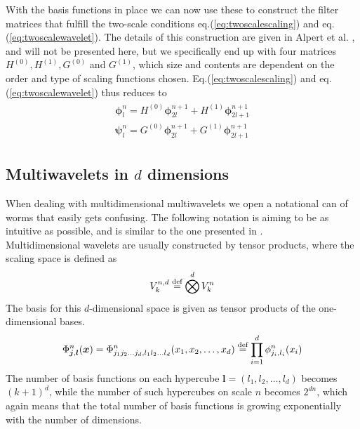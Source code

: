 \noindent
With the basis functions in place we can now use these to construct the filter
matrices that fulfill the two-scale conditions eq.(\ref{eq:twoscalescaling}) and
eq.(\ref{eq:twoscalewavelet}). The details of this construction are given in
Alpert et al. \cite{Alpert02}, and will not be presented here, but we
specifically end up with four matrices $H^{(0)}, H^{(1)}, G^{(0)}$ and
$G^{(1)}$, which size and contents are dependent on the order and type of
scaling functions chosen. Eq.(\ref{eq:twoscalescaling}) and 
eq.(\ref{eq:twoscalewavelet}) thus reduces to
\begin{eqnarray}
	\label{eq:twoscalerelations}
	\begin{split}
	\boldsymbol{\phi}_l^n = H^{(0)}\boldsymbol{\phi}_{2l}^{n+1} + 
							  H^{(1)}\boldsymbol{\phi}_{2l+1}^{n+1}\\
	\boldsymbol{\psi}_l^n = G^{(0)}\boldsymbol{\phi}_{2l}^{n+1} + 
							  G^{(1)}\boldsymbol{\phi}_{2l+1}^{n+1}
	\end{split}
\end{eqnarray}

\subsection{Multiwavelets in $d$ dimensions}
When dealing with multidimensional multiwavelets we open a notational can of
worms that easily gets confusing. The following notation is aiming to be as
intuitive as possible, and is similar to the one presented in 
\cite{Fossgaard}.\\

\noindent
Multidimensional wavelets are usually constructed by tensor products, where the
scaling space is defined as
\begin{equation}
	V^{n,d}_k \stackrel{\text{def}}{\hbox{=}} \bigotimes^d V^n_k
\end{equation}
The basis for this $d$-dimensional space is given as tensor products of the
one-dimensional bases.
\begin{equation}
	\label{eq:multidimscaling}
	\Phi^n_{\boldsymbol{j},\boldsymbol{l}}(\boldsymbol{x}) = 
	\Phi^n_{j_1 j_2\dots j_d,l_1 l_2\dots l_d} (x_1,x_2,\dots,x_d) \stackrel{\text{def}}{\hbox{=}}
	\prod_{i=1}^d \phi^n_{j_i,l_i}(x_i)
\end{equation}
The number of basis functions on each hypercube
$\boldsymbol{l}=(l_1,l_2,\dots,l_d)$ becomes $(k+1)^d$, while the number of 
such hypercubes on scale $n$ becomes $2^{dn}$, which again means that the total 
number of basis functions is growing exponentially with the number of
dimensions.\\

